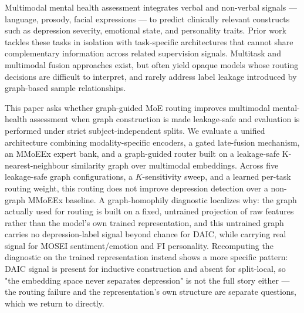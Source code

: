 \documentclass[letterpaper]{article}
\begin{document}
Multimodal mental health assessment integrates verbal and non-verbal signals — language, prosody, facial expressions — to predict clinically relevant constructs such as depression severity, emotional state, and personality traits. Prior work tackles these tasks in isolation with task-specific architectures that cannot share complementary information across related supervision signals. Multitask and multimodal fusion approaches exist, but often yield opaque models whose routing decisions are difficult to interpret, and rarely address label leakage introduced by graph-based sample relationships.

This paper asks whether graph-guided MoE routing improves multimodal mental-health assessment when graph construction is made leakage-safe and evaluation is performed under strict subject-independent splits. We evaluate a unified architecture combining modality-specific encoders, a gated late-fusion mechanism, an MMoEEx expert bank, and a graph-guided router built on a leakage-safe K-nearest-neighbour similarity graph over multimodal embeddings. Across five leakage-safe graph configurations, a $K$-sensitivity sweep, and a learned per-task routing weight, this routing does not improve depression detection over a non-graph MMoEEx baseline. A graph-homophily diagnostic localizes why: the graph actually used for routing is built on a fixed, untrained projection of raw features rather than the model's own trained representation, and this untrained graph carries no depression-label signal beyond chance for DAIC, while carrying real signal for MOSEI sentiment/emotion and FI personality. Recomputing the diagnostic on the trained representation instead shows a more specific pattern: DAIC signal is present for inductive construction and absent for split-local, so "the embedding space never separates depression" is not the full story either — the routing failure and the representation's own structure are separate questions, which we return to directly.
\end{document}
